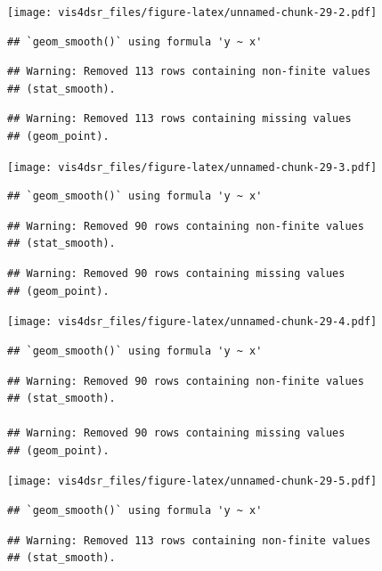 \documentclass[
]{krantz}
\begin{document}
\texttt{[image: vis4dsr\_files/figure-latex/unnamed-chunk-29-2.pdf]}

\begin{verbatim}
## `geom_smooth()` using formula 'y ~ x'
\end{verbatim}

\begin{verbatim}
## Warning: Removed 113 rows containing non-finite values
## (stat_smooth).
\end{verbatim}

\begin{verbatim}
## Warning: Removed 113 rows containing missing values
## (geom_point).
\end{verbatim}

\texttt{[image: vis4dsr\_files/figure-latex/unnamed-chunk-29-3.pdf]}

\begin{verbatim}
## `geom_smooth()` using formula 'y ~ x'
\end{verbatim}

\begin{verbatim}
## Warning: Removed 90 rows containing non-finite values
## (stat_smooth).
\end{verbatim}

\begin{verbatim}
## Warning: Removed 90 rows containing missing values
## (geom_point).
\end{verbatim}

\texttt{[image: vis4dsr\_files/figure-latex/unnamed-chunk-29-4.pdf]}

\begin{verbatim}
## `geom_smooth()` using formula 'y ~ x'
\end{verbatim}

\begin{verbatim}
## Warning: Removed 90 rows containing non-finite values
## (stat_smooth).

## Warning: Removed 90 rows containing missing values
## (geom_point).
\end{verbatim}

\texttt{[image: vis4dsr\_files/figure-latex/unnamed-chunk-29-5.pdf]}

\begin{verbatim}
## `geom_smooth()` using formula 'y ~ x'
\end{verbatim}

\begin{verbatim}
## Warning: Removed 113 rows containing non-finite values
## (stat_smooth).
\end{verbatim}
\end{document}
